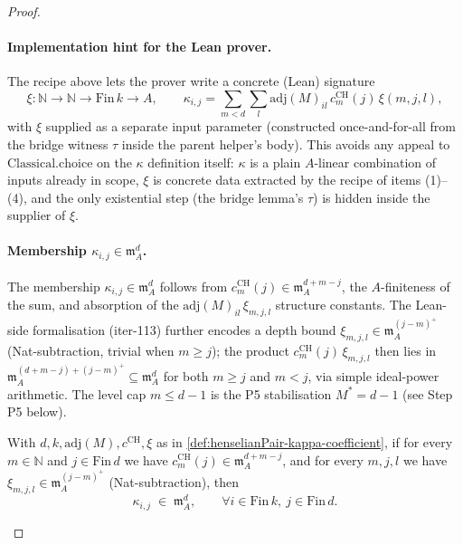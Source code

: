 \begin{proof}
\begin{definition}
\paragraph{Implementation hint for the Lean prover.} The
recipe above lets the prover write a concrete (Lean) signature
\[
\xi : \mathbb{N} \to \mathbb{N} \to \mathrm{Fin}\,k \to A,
\qquad
\kappa_{i,j} = \sum_{m < d} \sum_l
\mathrm{adj}(M)_{il}\,c^{\mathrm{CH}}_m(j)\,\xi(m, j, l),
\]
with $\xi$ supplied as a separate input parameter (constructed
once-and-for-all from the bridge witness $\tau$ inside the parent
helper's body). This avoids any appeal to
$\mathrm{Classical.choice}$ on the $\kappa$ definition itself:
$\kappa$ is a plain $A$-linear combination of inputs already in
scope, $\xi$ is concrete data extracted by the recipe of
items (1)--(4), and the only existential step (the bridge
lemma's $\tau$) is hidden inside the supplier of $\xi$.

\paragraph{Membership $\kappa_{i,j} \in \mathfrak m_A^{d}$.}
The membership $\kappa_{i,j} \in \mathfrak m_A^{d}$ follows from
$c^{\mathrm{CH}}_m(j) \in \mathfrak m_A^{d + m - j}$, the
$A$-finiteness of the sum, and absorption of the
$\mathrm{adj}(M)_{il}\,\xi_{m,j,l}$ structure constants. The
Lean-side formalisation (iter-113) further encodes a depth bound
$\xi_{m,j,l} \in \mathfrak m_A^{(j - m)^{+}}$ (Nat-subtraction,
trivial when $m \ge j$); the product
$c^{\mathrm{CH}}_m(j)\,\xi_{m,j,l}$ then lies in
$\mathfrak m_A^{(d + m - j) + (j - m)^{+}} \subseteq
\mathfrak m_A^{d}$ for both $m \ge j$ and $m < j$, via simple
ideal-power arithmetic. The level cap $m \le d - 1$ is the
P5 stabilisation $M^* = d - 1$ (see Step P5 below).
\end{definition}

\begin{lemma}
\label{lem:henselianPair-kappa-coefficient-mem}
With $d, k, \mathrm{adj}(M), c^{\mathrm{CH}}, \xi$ as in
\cref{def:henselianPair-kappa-coefficient}, if for every
$m \in \mathbb N$ and $j \in \mathrm{Fin}\,d$ we have
$c^{\mathrm{CH}}_m(j) \in \mathfrak m_A^{d + m - j}$, and for
every $m, j, l$ we have
$\xi_{m,j,l} \in \mathfrak m_A^{(j - m)^{+}}$
(Nat-subtraction), then
\[
\kappa_{i,j} \;\in\; \mathfrak m_A^{d}, \qquad
\forall i \in \mathrm{Fin}\,k,\ j \in \mathrm{Fin}\,d.
\]
\end{lemma}


\end{proof}

